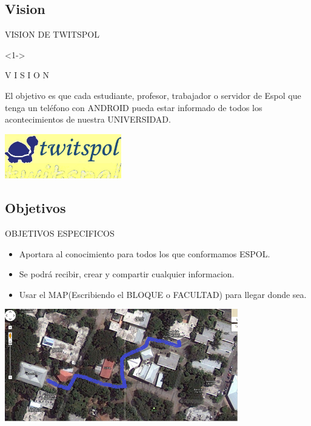 \documentclass{beamer}
\begin{document}
		\subsection{Vision}
		\begin{frame}{VISION DE TWITSPOL}
			\begin{block}<1->{\begin{center}{V I S I O N}\end{center}}
				\begin{center}
					El objetivo es que cada estudiante, profesor, trabajador o servidor de Espol que tenga un teléfono con 							ANDROID pueda estar informado de todos los acontecimientos de nuestra UNIVERSIDAD.
				\end{center}
			\end{block}
			
			\begin{center}
			   \includegraphics[totalheight=1.2in,width=2in]{NTwitspol}
			\end{center}
		\end{frame}

		\subsection{Objetivos}
		\begin{frame}{OBJETIVOS ESPECIFICOS}
			\begin{itemize}[<+->]
				\item 
					Aportara al conocimiento para todos los que conformamos ESPOL.
				\item
					Se podrá recibir, crear y compartir cualquier informacion.
				\item
					Usar el MAP(Escribiendo el BLOQUE o FACULTAD) para llegar donde sea.
			\end{itemize}
			\begin{center}
				\includegraphics[totalheight=1.2in,width=4in]{Camino}
			\end{center}
		\end{frame}	
\end{document}
